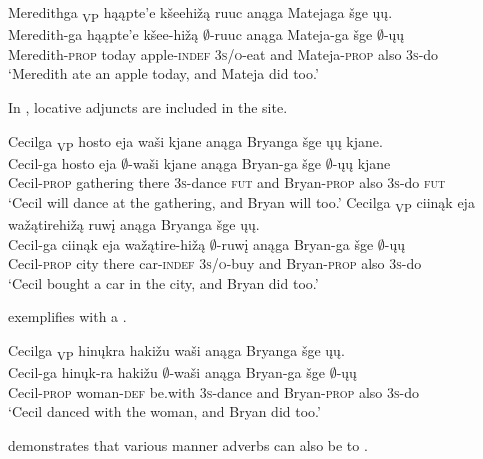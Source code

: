 \documentclass[output=paper]{LSP/langsci}
\begin{document}
\ex 
\glll Meredithga  {\ob}\textsubscript{VP} hąąpte'e kšeehižą ruuc{\cb} anąga Matejaga šge {\ob}ųų{\cb}.\\
Meredith-ga {} hąąpte'e kšee-hižą $\emptyset$-ruuc anąga Mateja-ga šge $\emptyset$-ųų\\
Meredith-\textsc{prop} {} today apple-\textsc{indef  3s/o}-eat and Mateja-\textsc{prop} also \textsc{3s}-do\\
\trans `Meredith ate an apple today, and Mateja did too.'
\z
\z

In , locative adjuncts are included in the  site. 
 
\ea\label{ex:johnson:8}
\ea 
\glll Cecilga {\ob}\textsubscript{VP} hosto eja waši{\cb} kjane anąga Bryanga šge {\ob}ųų{\cb} kjane.\\
Cecil-ga {} hosto eja $\emptyset$-waši kjane anąga Bryan-ga šge $\emptyset$-ųų kjane\\
Cecil-\textsc{prop} {} gathering there \textsc{3s}-dance \textsc{fut} and Bryan-\textsc{prop} also \textsc{3s}-do \textsc{fut}\\
\trans `Cecil will dance at the gathering, and Bryan will too.'
\ex 
\glll Cecilga {\ob} \textsubscript{VP} ciinąk eja wažątirehižą ruwį{\cb} anąga Bryanga šge {\ob}ųų{\cb}.\\
Cecil-ga {} ciinąk eja wažątire-hižą $\emptyset$-ruwį anąga Bryan-ga šge $\emptyset$-ųų\\
Cecil-\textsc{prop} {} city there car-\textsc{indef} \textsc{3s/o}-buy and Bryan-\textsc{prop} also \textsc{3s}-do\\
\trans `Cecil bought a car in the city, and Bryan did too.'
\z
\z

 exemplifies  with a .
 
\ea\label{ex:johnson:9} 
\glll Cecilga {\ob}\textsubscript{VP} hinųkra hakižu waši{\cb} anąga Bryanga šge {\ob}ųų{\cb}.\\
Cecil-ga {} hinųk-ra hakižu $\emptyset$-waši anąga Bryan-ga šge $\emptyset$-ųų\\
Cecil-\textsc{prop} {} woman-\textsc{def} be.with \textsc{3s}-dance and Bryan-\textsc{prop} also \textsc{3s}-do\\
\trans `Cecil danced with the woman, and Bryan did too.'
\z

 demonstrates that various manner adverbs can also be  to .
 
\end{document}
